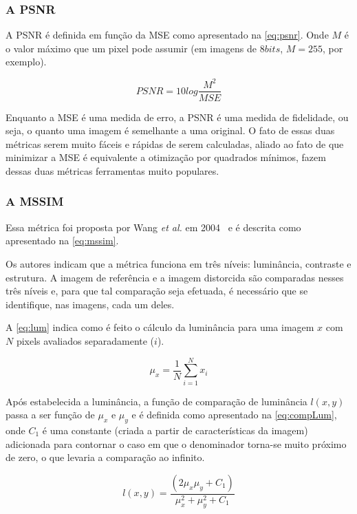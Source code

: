 \subsubsection{A PSNR}

A PSNR é definida em função da MSE como apresentado na \autoref{eq:psnr}. Onde $M$ é o valor máximo que um pixel pode assumir (em imagens de $8 bits$, $M=255$, por exemplo).

\begin{equation}\label{eq:psnr}
	PSNR = 10log\frac{M^2}{MSE}
\end{equation}

Enquanto a MSE é uma medida de erro, a PSNR é uma medida de fidelidade, ou seja, o quanto uma imagem é semelhante a uma original. O fato de essas duas métricas serem muito fáceis e rápidas de serem calculadas, aliado ao fato de que minimizar a MSE é equivalente a otimização por quadrados mínimos, fazem dessas duas métricas ferramentas muito populares.

\subsubsection{A MSSIM}

Essa métrica foi proposta por Wang \emph{et al.} em 2004~\cite{mssim2004} e é descrita como apresentado na \autoref{eq:mssim}.

Os autores indicam que a métrica funciona em três níveis: luminância, contraste e estrutura. A imagem de referência e a imagem distorcida são comparadas nesses três níveis e, para que tal comparação seja efetuada, é necessário que se identifique, nas imagens, cada um deles.

A \autoref*{eq:lum} indica como é feito o cálculo da luminância para uma imagem $x$ com $N$ pixels avaliados separadamente ($i$).

\begin{equation}\label{eq:lum}
	\mu_x = \frac{1}{N}\sum^{N}_{i=1}x_i
\end{equation}

Após estabelecida a luminância, a função de comparação de luminância $l(x,y)$ passa a ser função de $\mu_x$ e $\mu_y$ e é definida como apresentado na \autoref*{eq:compLum}, onde $C_1$ é uma constante (criada a partir de características da imagem) adicionada para contornar o caso em que o denominador torna-se muito próximo de zero, o que levaria a comparação ao infinito.

\begin{equation}\label{eq:compLum}
	l(x,y) = \frac{(2\mu_x\mu_y + C_1)}{\mu^{2}_{x} + \mu^{2}_{y} + C_1}
\end{equation}

